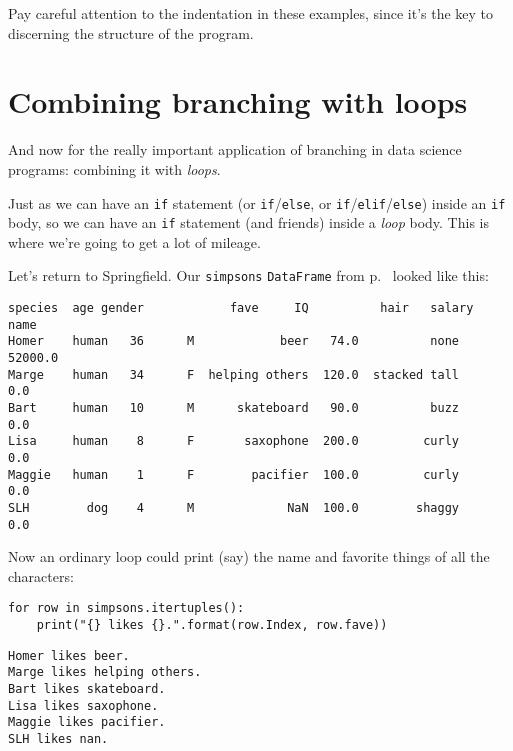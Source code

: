 
Pay careful attention to the indentation in these examples, since it's the key
to discerning the structure of the program.


\section{Combining branching with loops}


And now for the really important application of branching in data science
programs: combining it with \textit{loops}.

Just as we can have an \texttt{if} statement (or \texttt{if}/\texttt{else}, or
\texttt{if}/\texttt{elif}/\texttt{else}) inside an \texttt{if} body, so we can
have an \texttt{if} statement (and friends) inside a \textit{loop} body. This
is where we're going to get a lot of mileage.

Let's return to Springfield. Our \texttt{simpsons} \texttt{DataFrame} from
p.~\pageref{finalSimpsons} looked like this:

\begin{Verbatim}[fontsize=\small,samepage=true,frame=leftline,framesep=5mm,framerule=1mm]
       species  age gender            fave     IQ          hair   salary
name                                                                    
Homer    human   36      M            beer   74.0          none  52000.0
Marge    human   34      F  helping others  120.0  stacked tall      0.0
Bart     human   10      M      skateboard   90.0          buzz      0.0
Lisa     human    8      F       saxophone  200.0         curly      0.0
Maggie   human    1      F        pacifier  100.0         curly      0.0
SLH        dog    4      M             NaN  100.0        shaggy      0.0
\end{Verbatim}

Now an ordinary loop could print (say) the name and favorite things of all the
characters:


\begin{Verbatim}[fontsize=\footnotesize,samepage=true,frame=single,framesep=3mm]
for row in simpsons.itertuples():
    print("{} likes {}.".format(row.Index, row.fave))
\end{Verbatim}
\vspace{-.2in}

\begin{Verbatim}[fontsize=\footnotesize,samepage=true,frame=leftline,framesep=5mm,framerule=1mm]
Homer likes beer.
Marge likes helping others.
Bart likes skateboard.
Lisa likes saxophone.
Maggie likes pacifier.
SLH likes nan.
\end{Verbatim}

